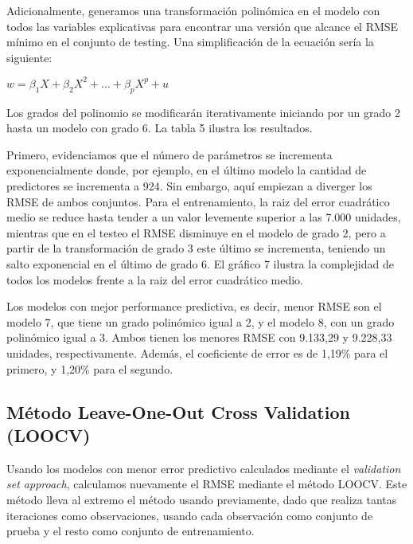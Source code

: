 \documentclass[11pt,oneside]{article}
\begin{document}
	Adicionalmente, generamos una transformación polinómica en el modelo con todos las variables explicativas para encontrar una versión que alcance el RMSE mínimo en el conjunto de testing. Una simplificación de la ecuación sería la siguiente:
	
	\begin{center}
		$w = \beta_{1}X + \beta_{2}X^2 + ... + \beta_{p}X^p + u$
	\end{center}
	
	Los grados del polinomio se modificarán iterativamente iniciando por un grado 2 hasta un modelo con grado 6. La tabla 5 ilustra los resultados.
	
	
	Primero, evidenciamos que el número de parámetros se incrementa exponencialmente donde, por ejemplo, en el último modelo la cantidad de predictores se incrementa a 924. Sin embargo, aquí empiezan a diverger los RMSE de ambos conjuntos. Para el entrenamiento, la raiz del error cuadrático medio se reduce hasta tender a un valor levemente superior a las 7.000 unidades, mientras que en el testeo el RMSE disminuye en el modelo de grado 2, pero a partir de la transformación de grado 3 este último se incrementa, teniendo un salto exponencial en el último de grado 6. %
	El gráfico 7 ilustra la complejidad de todos los modelos frente a la raiz del error cuadrático medio. 
	
	
	Los modelos con mejor performance predictiva, es decir, menor RMSE son el modelo 7, que tiene un grado polinómico igual a 2, y el modelo 8, con un grado polinómico igual a 3. Ambos tienen los menores RMSE con 9.133,29 y 9.228,33 unidades, respectivamente. Además, el coeficiente de error es de 1,19\% para el primero, y 1,20\% para el segundo. 
	
	\subsection{Método Leave-One-Out Cross Validation (LOOCV)}
	
	Usando los modelos con menor error predictivo calculados mediante el \textit{validation set approach}, calculamos nuevamente el RMSE mediante el método LOOCV. Este método lleva al extremo el método usando previamente, dado que realiza tantas iteraciones como observaciones, usando cada observación como conjunto de prueba y el resto como conjunto de entrenamiento.
\end{document}
